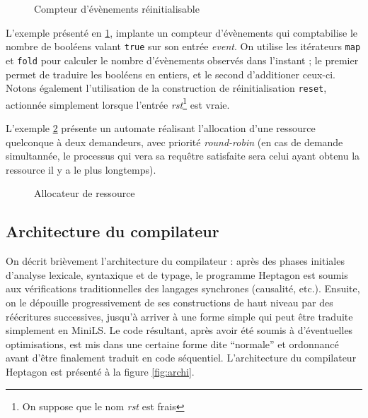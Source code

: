 \documentclass[9pt,a4paper]{article}
\newcommand{\LANG}{Heptagon}
\begin{document}
\begin{figure}[htp]
  \centering
  
  \caption{Compteur d'évènements réinitialisable}
  \label{fig:ex_count}
\end{figure}

L'exemple présenté en \ref{fig:ex_count}, implante un compteur d'évènements qui
comptabilise le nombre de booléens valant \texttt{true} sur son entrée
\textit{event}. On utilise les itérateurs \texttt{map} et \texttt{fold} pour
calculer le nombre d'évènements observés dans l'instant ; le premier permet de
traduire les booléens en entiers, et le second d'additioner ceux-ci. Notons
également l'utilisation de la construction de réinitialisation \texttt{reset},
actionnée simplement lorsque l'entrée \textit{rst}\footnote{On suppose que le
  nom \textit{rst} est frais} est vraie.

L'exemple \ref{fig:ex_alloc} présente un automate réalisant l'allocation d'une
ressource quelconque à deux demandeurs, avec priorité \textit{round-robin} (en
cas de demande simultannée, le processus qui vera sa requêtre satisfaite sera
celui ayant obtenu la ressource il y a le plus longtemps).

\begin{figure}[htp]
  \centering
  
  \caption{Allocateur de ressource}
  \label{fig:ex_alloc}
\end{figure}

\subsection{Architecture du compilateur}

On décrit brièvement l'architecture du compilateur : après des phases initiales
d'analyse lexicale, syntaxique et de typage, le programme \LANG{} est soumis aux
vérifications traditionnelles des langages synchrones (causalité,
etc.). Ensuite, on le dépouille progressivement de ses constructions de haut
niveau par des réécritures successives, jusqu'à arriver à une forme simple qui
peut être traduite simplement en MiniLS. Le code résultant, après avoir été
soumis à d'éventuelles optimisations, est mis dans une certaine forme dite
``normale'' et ordonnancé avant d'être finalement traduit en code
séquentiel. L'architecture du compilateur \LANG{} est présenté à la figure
\ref{fig:archi}.
\end{document}
